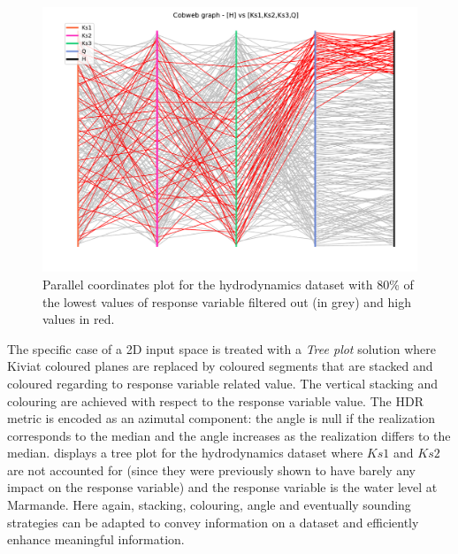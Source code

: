 \begin{figure}[!h]
\centering
\includegraphics[width=0.8\linewidth,keepaspectratio]{fig/contributions/visu/mascaret_cobweb.pdf}
\caption{Parallel coordinates plot for the hydrodynamics dataset with 80\% of the lowest values of response variable filtered out (in grey) and high values in red.}
\label{fig:cobweb-Kiviat}
\end{figure}

The specific case of a 2D input space is treated with a \emph{Tree plot} solution where Kiviat coloured planes are replaced by coloured segments that are stacked and coloured regarding to response variable related value. The vertical stacking and colouring are achieved with respect to the response variable value. The HDR metric is encoded as an azimutal component: the angle is null if the realization corresponds to the median and the angle increases as the realization differs to the median.  displays a tree plot for the hydrodynamics dataset where $Ks1$ and $Ks2$ are not accounted for (since they were previously shown to have barely any impact on the response variable) and the response variable is the water level at Marmande. Here again, stacking, colouring, angle and eventually sounding strategies can be adapted to convey information on a dataset and efficiently enhance meaningful information.

